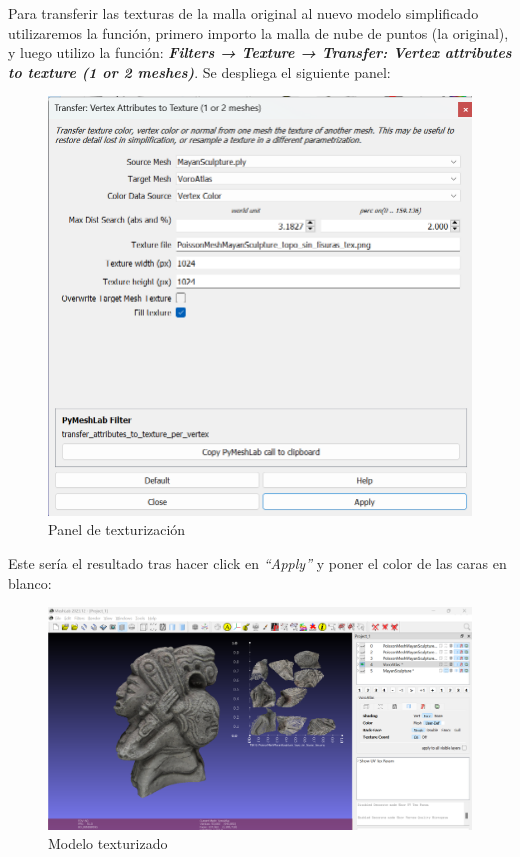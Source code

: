 \documentclass[options]{article}
\begin{document}
Para transferir las texturas de la malla original al nuevo modelo simplificado utilizaremos la función, primero importo la malla de nube de puntos (la original), y luego utilizo la función: \textbf{\textit{Filters → Texture → Transfer: Vertex attributes to texture (1 or 2 meshes)}}. Se despliega el siguiente panel:

\begin{figure}[H]
    \centering
    \includegraphics[scale=0.34]{images/textura_02.png}
    \caption{Panel de texturización}
\end{figure}

Este sería el resultado tras hacer click en \textit{``Apply''} y poner el color de las caras en blanco:

\begin{figure}[H]
    \centering
    \includegraphics[scale=0.34]{images/textura_03.png}
    \caption{Modelo texturizado}
\end{figure}
\end{document}
